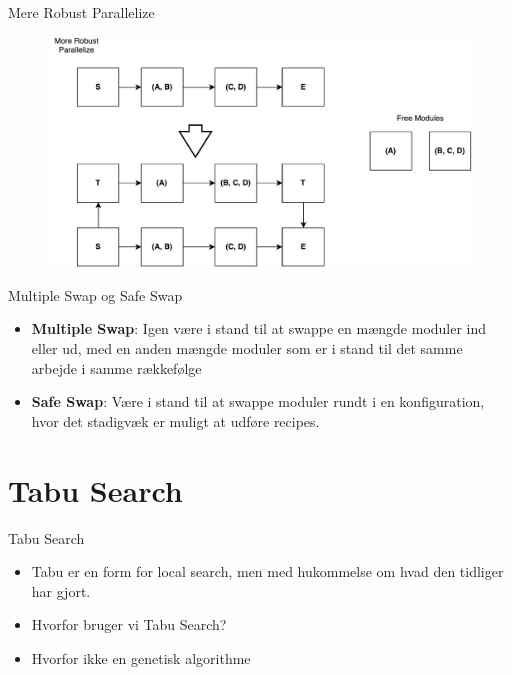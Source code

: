 \begin{frame} {Mere Robust Parallelize}
	\begin{figure}
		\centering
		\includegraphics[width=1\textwidth]{figures/mrpara.pdf}
	\end{figure}
\end{frame}

\begin{frame}{Multiple Swap og Safe Swap}
	\begin{itemize}
		\item \textbf{Multiple Swap}: Igen være i stand til at swappe en mængde moduler ind eller ud, med en anden mængde moduler som er i stand til det samme arbejde i samme rækkefølge
		\item \textbf{Safe Swap}: Være i stand til at swappe moduler rundt i en konfiguration, hvor det stadigvæk er muligt at udføre recipes.
	\end{itemize}
\end{frame}



\section{Tabu Search}
\begin{frame} {Tabu Search}
	\begin{itemize}
		\item Tabu er en form for local search, men med hukommelse om hvad den tidliger har gjort.
		\item Hvorfor bruger vi Tabu Search?
		\item Hvorfor ikke en genetisk algorithme
	\end{itemize}
\end{frame}

